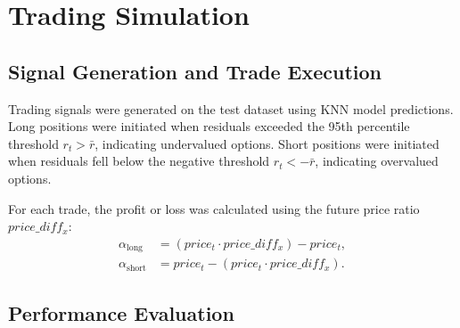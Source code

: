 \documentclass{article}
\begin{document}
\begin{table}[h]
  \centering
  \caption{Mean future price ratios by residual group and associated $p$-values. * indicates significance at $p = 0.05$.}
  \label{tab:mean-return}
\end{table}

\section{Trading Simulation}

\subsection{Signal Generation and Trade Execution}

Trading signals were generated on the test dataset using KNN model predictions. Long positions were initiated when residuals exceeded the 95th percentile threshold $r_t > \bar{r}$, indicating undervalued options. Short positions were initiated when residuals fell below the negative threshold $r_t < -\bar{r}$, indicating overvalued options.

For each trade, the profit or loss was calculated using the future price ratio $price\_diff_x$:
\begin{align*}
\alpha_{\text{long}} &= (price_t \cdot price\_diff_x) - price_t,\\
\alpha_{\text{short}} &= price_t - (price_t \cdot price\_diff_x).
\end{align*}

\subsection{Performance Evaluation}
\end{document}
